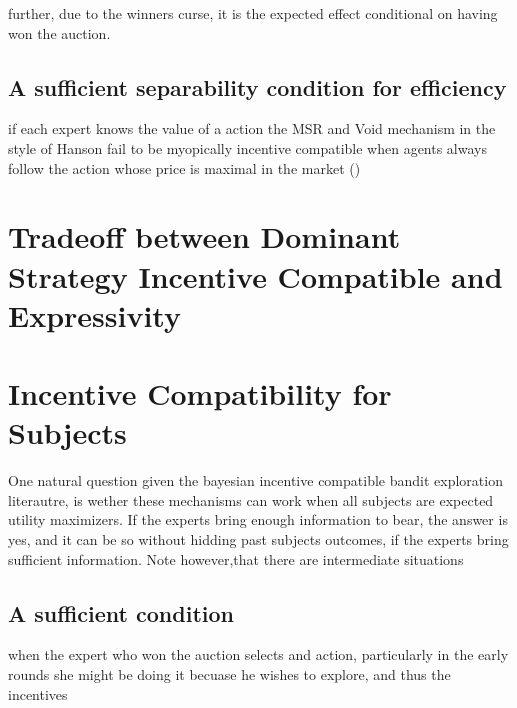 further, due to the winners curse, it is the expected effect conditional on having won the auction. 


\subsection{A sufficient separability condition for efficiency}

if each expert knows the value of a action the MSR and Void mechanism in the style of Hanson fail to be myopically incentive compatible when agents always follow the action whose price is maximal in the market (\cite{othman2010decision})



\section{Tradeoff between Dominant Strategy Incentive Compatible and Expressivity}



\section{Incentive Compatibility for Subjects}

One natural question given the bayesian incentive compatible bandit exploration literautre, is wether these mechanisms can work when all subjects are expected utility maximizers. If the experts bring enough information to bear, the answer is yes, and it can be so without hidding past subjects outcomes, if the experts bring sufficient information. Note however,that there are intermediate situations 

\subsection{A sufficient condition}

when the expert who won the auction selects and action, particularly in the early rounds she might be doing it becuase he wishes to explore, and thus the incentives 


